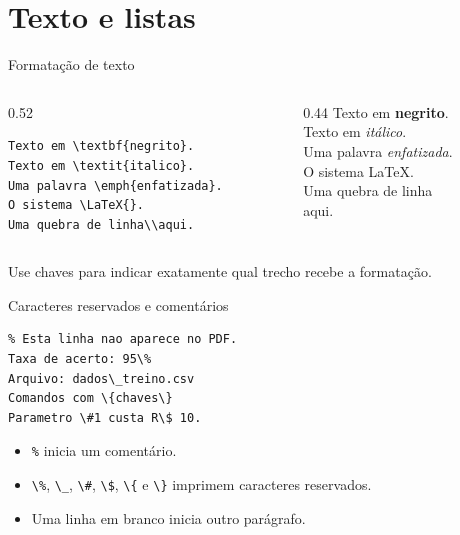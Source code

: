 \section{Texto e listas}

\begin{frame}[fragile]{Formatação de texto}
\begin{columns}[T]
\begin{column}{0.52\textwidth}
\begin{lstlisting}
Texto em \textbf{negrito}.
Texto em \textit{italico}.
Uma palavra \emph{enfatizada}.
O sistema \LaTeX{}.
Uma quebra de linha\\aqui.
\end{lstlisting}
\end{column}
\begin{column}{0.44\textwidth}
Texto em \textbf{negrito}.\\
Texto em \textit{itálico}.\\
Uma palavra \emph{enfatizada}.\\
O sistema \LaTeX{}.\\
Uma quebra de linha\\aqui.
\end{column}
\end{columns}

Use chaves para indicar exatamente qual trecho recebe a formatação.
\end{frame}

\begin{frame}[fragile]{Caracteres reservados e comentários}
\begin{lstlisting}
% Esta linha nao aparece no PDF.
Taxa de acerto: 95\%
Arquivo: dados\_treino.csv
Comandos com \{chaves\}
Parametro \#1 custa R\$ 10.
\end{lstlisting}

\begin{itemize}
    \item \verb|%| inicia um comentário.
    \item \verb|\%|, \verb|\_|, \verb|\#|, \verb|\$|, \verb|\{| e \verb|\}| imprimem caracteres reservados.
    \item Uma linha em branco inicia outro parágrafo.
\end{itemize}
\end{frame}

